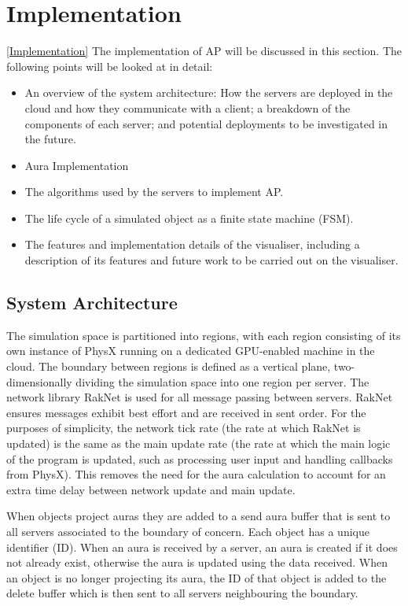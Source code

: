 \chapter{Implementation}\ref{Implementation}
The implementation of AP will be discussed in this section. The following points will be looked at in detail: 
\begin{itemize}
	\item An overview of the system architecture: How the servers are deployed in the cloud and how they communicate with a client; a breakdown of the components of each server; and potential deployments to be investigated in the future.
	\item Aura Implementation
	\item The algorithms used by the servers to implement AP.
	\item The life cycle of a simulated object as a finite state machine (FSM).
	\item The features and implementation details of the visualiser, including a description of its features and future work to be carried out on the visualiser.
\end{itemize}

\section{System Architecture}
The simulation space is partitioned into regions, with each region consisting of its own instance of PhysX running on a dedicated GPU-enabled machine in the cloud. The boundary between regions is defined as a vertical plane, two-dimensionally dividing the simulation space into one region per server. The network library RakNet is used for all message passing between servers. RakNet ensures messages exhibit best effort and are received in sent order. For the purposes of simplicity, the network tick rate (the rate at which RakNet is updated) is the same as the main update rate (the rate at which the main logic of the program is updated, such as processing user input and handling callbacks from PhysX). This removes the need for the aura calculation to account for an extra time delay between network update and main update.

When objects project auras they are added to a send aura buffer that is sent to all servers associated to the boundary of concern. Each object has a unique identifier (ID). When an aura is received by a server, an aura is created if it does not already exist, otherwise the aura is updated using the data received. When an object is no longer projecting its aura, the ID of that object is added to the delete buffer which is then sent to all servers neighbouring the boundary.

